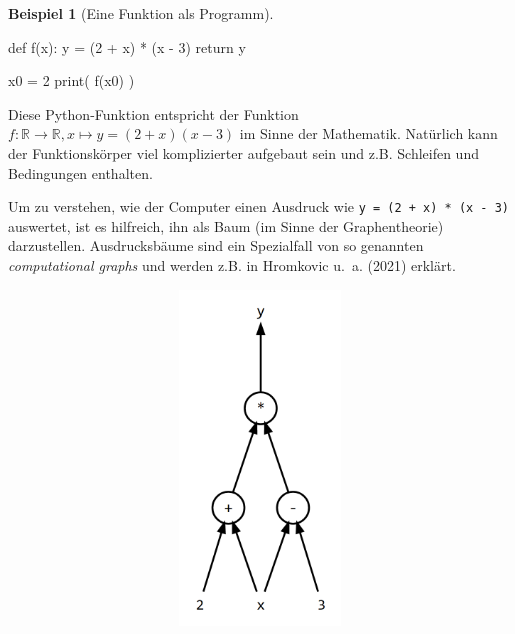 \documentclass[
  letterpaper,
  DIV=11,
  oneside]{scrreprt}
\newenvironment{Shaded}{\begin{snugshade}}{\end{snugshade}}
\newcommand{\BuiltInTok}[1]{\textcolor[rgb]{0.00,0.23,0.31}{#1}}
\newcommand{\ControlFlowTok}[1]{\textcolor[rgb]{0.00,0.23,0.31}{#1}}
\newcommand{\DecValTok}[1]{\textcolor[rgb]{0.68,0.00,0.00}{#1}}
\newcommand{\KeywordTok}[1]{\textcolor[rgb]{0.00,0.23,0.31}{#1}}
\newcommand{\NormalTok}[1]{\textcolor[rgb]{0.00,0.23,0.31}{#1}}
\newcommand{\OperatorTok}[1]{\textcolor[rgb]{0.37,0.37,0.37}{#1}}
\theoremstyle{definition}
\theoremstyle{definition}
\newtheorem{example}{Beispiel}[chapter]
\theoremstyle{remark}
\begin{document}
\leavevmode{}%
\begin{example}[Eine Funktion als
Programm]\label{exm-FirstFunctionAsProgram}

\begin{Shaded}
\begin{Highlighting}[]
\KeywordTok{def}\NormalTok{ f(x):}
\NormalTok{    y }\OperatorTok{=}\NormalTok{ (}\DecValTok{2} \OperatorTok{+}\NormalTok{ x) }\OperatorTok{*}\NormalTok{ (x }\OperatorTok{{-}} \DecValTok{3}\NormalTok{)}
    \ControlFlowTok{return}\NormalTok{ y}

\NormalTok{x0 }\OperatorTok{=} \DecValTok{2}
\BuiltInTok{print}\NormalTok{( f(x0) )}
\end{Highlighting}
\end{Shaded}

Diese Python-Funktion entspricht der Funktion
\(f:\mathbb{R}\rightarrow\mathbb{R} , x \mapsto y=(2+x)(x-3)\) im Sinne
der Mathematik. Natürlich kann der Funktionskörper viel komplizierter
aufgebaut sein und z.B. Schleifen und Bedingungen enthalten.

Um zu verstehen, wie der Computer einen Ausdruck wie
\texttt{y\ =\ (2\ +\ x)\ *\ (x\ -\ 3)} auswertet, ist es hilfreich, ihn
als Baum (im Sinne der Graphentheorie) darzustellen. Ausdrucksbäume sind
ein Spezialfall von so genannten \emph{computational graphs} und werden
z.B. in Hromkovic u.~a. (2021) erklärt.

\begin{figure}

{\centering 

\begin{figure}[H]

{\centering \includegraphics[width=5.5in,height=3.5in]{./intro_files/figure-latex/dot-figure-1.png}

}
\end{figure}}
\end{figure}
\end{example}
\end{document}
